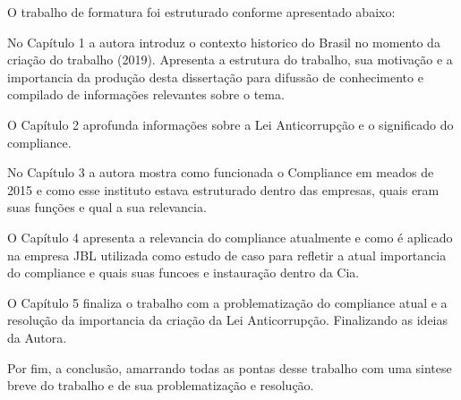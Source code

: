 O trabalho de formatura foi estruturado conforme apresentado abaixo:

No Capítulo 1 a autora introduz o contexto historico do Brasil no momento da criação do trabalho (2019). Apresenta a estrutura do trabalho, sua motivação e a importancia da produção desta dissertação para difussão de conhecimento e compilado de informações relevantes sobre o tema. 

O Capítulo 2 aprofunda informações sobre a Lei Anticorrupção e o significado do compliance.

No Capítulo 3 a autora mostra como funcionada o Compliance em meados de 2015 e como esse instituto estava estruturado dentro das empresas, quais eram suas funções e qual a sua relevancia. 

O Capítulo 4 apresenta a relevancia do compliance atualmente e como é aplicado na empresa JBL utilizada como estudo de caso para refletir a atual importancia do compliance e quais suas funcoes e instauração dentro da Cia. 

O Capítulo 5 finaliza o trabalho com a problematização do compliance atual e a resolução da importancia da criação da Lei Anticorrupção. Finalizando as ideias da Autora. 

Por fim, a conclusão, amarrando todas as pontas desse trabalho com uma sintese breve do trabalho e de sua problematização e resolução. 

